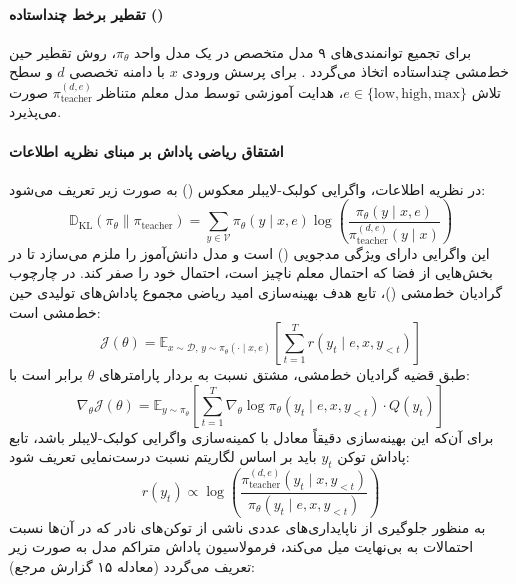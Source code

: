 \paragraph*{تقطیر برخط چنداستاده ()}
برای تجمیع توانمندی‌های ۹ مدل متخصص در یک مدل واحد $\pi_\theta$، روش تقطیر حین خط‌مشی چنداستاده اتخاذ می‌گردد \cite{lu2025onpolicy, xiao2026mimo, deepseek2026v4}. برای پرسش ورودی $x$ با دامنه تخصصی $d$ و سطح تلاش $e \in \{\text{low}, \text{high}, \text{max}\}$، هدایت آموزشی توسط مدل معلم متناظر $\pi_{\text{teacher}}^{(d,e)}$ صورت می‌پذیرد.

\paragraph*{اشتقاق ریاضی پاداش  بر مبنای نظریه اطلاعات}
در نظریه اطلاعات، واگرایی کولبک-لایبلر معکوس () به صورت زیر تعریف می‌شود:
\begin{equation}
    \mathbb{D}_{\text{KL}}\left( \pi_\theta \parallel \pi_{\text{teacher}} \right) = \sum_{y \in \mathcal{V}} \pi_\theta(y \mid x, e) \log \left( \frac{\pi_\theta(y \mid x, e)}{\pi_{\text{teacher}}^{(d,e)}(y \mid x)} \right)
\end{equation}
این واگرایی دارای ویژگی مدجویی () است و مدل دانش‌آموز را ملزم می‌سازد تا در بخش‌هایی از فضا که احتمال معلم ناچیز است، احتمال خود را صفر کند. در چارچوب گرادیان خط‌مشی ()، تابع هدف بهینه‌سازی امید ریاضی مجموع پاداش‌های تولیدی حین خط‌مشی است:
\begin{equation}
    \mathcal{J}(\theta) = \mathbb{E}_{x \sim \mathcal{D}, \, y \sim \pi_\theta(\cdot \mid x, e)} \left[ \sum_{t=1}^T r(y_t \mid e, x, y_{<t}) \right]
\end{equation}
طبق قضیه گرادیان خط‌مشی، مشتق نسبت به بردار پارامترهای $\theta$ برابر است با:
\begin{equation}
    \nabla_\theta \mathcal{J}(\theta) = \mathbb{E}_{y \sim \pi_\theta} \left[ \sum_{t=1}^T \nabla_\theta \log \pi_\theta(y_t \mid e, x, y_{<t}) \cdot Q(y_t) \right]
\end{equation}
برای آن‌که این بهینه‌سازی دقیقاً معادل با کمینه‌سازی واگرایی کولبک-لایبلر باشد، تابع پاداش توکن $y_t$ باید بر اساس لگاریتم نسبت درست‌نمایی تعریف شود:
\begin{equation}
    r(y_t) \propto \log \left( \frac{\pi_{\text{teacher}}^{(d,e)}(y_t \mid x, y_{<t})}{\pi_\theta(y_t \mid e, x, y_{<t})} \right)
\end{equation}
به منظور جلوگیری از ناپایداری‌های عددی ناشی از توکن‌های نادر که در آن‌ها نسبت احتمالات به بی‌نهایت میل می‌کند، فرمولاسیون پاداش متراکم مدل به صورت زیر تعریف می‌گردد (معادله ۱۵ گزارش مرجع):
